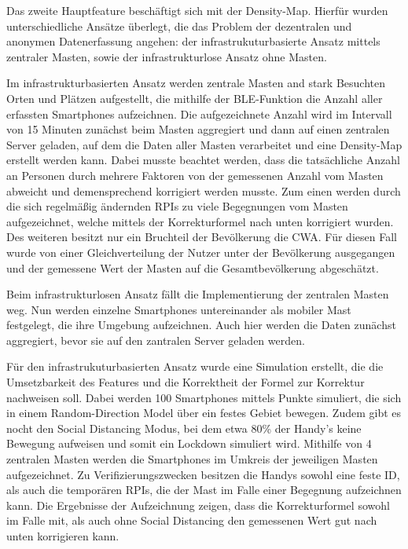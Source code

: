 \documentclass[conference,compsoc]{IEEEtran}
\begin{document}
Das zweite Hauptfeature beschäftigt sich mit der Density-Map. 
Hierfür wurden unterschiedliche Ansätze überlegt, die das Problem der dezentralen und anonymen Datenerfassung angehen: 
der infrastrukuturbasierte Ansatz mittels zentraler Masten, sowie der infrastrukturlose Ansatz ohne Masten. 

Im infrastrukturbasierten Ansatz werden zentrale Masten and stark Besuchten Orten und Plätzen aufgestellt, die mithilfe der BLE-Funktion die Anzahl aller erfassten Smartphones aufzeichnen.
Die aufgezeichnete Anzahl wird im Intervall von 15 Minuten zunächst beim Masten aggregiert und dann auf einen zentralen Server geladen, auf dem die Daten aller Masten verarbeitet und eine Density-Map erstellt werden kann.
Dabei musste beachtet werden, dass die tatsächliche Anzahl an Personen durch mehrere Faktoren von der gemessenen Anzahl vom Masten abweicht und demensprechend korrigiert werden musste.
Zum einen werden durch die sich regelmäßig ändernden RPIs zu viele Begegnungen vom Masten aufgezeichnet, welche mittels der Korrekturformel nach unten korrigiert wurden.
Des weiteren besitzt nur ein Bruchteil der Bevölkerung die CWA. Für diesen Fall wurde von einer Gleichverteilung der Nutzer unter der Bevölkerung ausgegangen und der gemessene Wert der Masten auf die Gesamtbevölkerung abgeschätzt.

Beim infrastrukturlosen Ansatz fällt die Implementierung der zentralen Masten weg. 
Nun werden einzelne Smartphones untereinander als mobiler Mast festgelegt, die ihre Umgebung aufzeichnen.
Auch hier werden die Daten zunächst aggregiert, bevor sie auf den zantralen Server geladen werden.

Für den infrastrukuturbasierten Ansatz wurde eine Simulation erstellt, die die Umsetzbarkeit des Features und die Korrektheit der Formel zur Korrektur nachweisen soll. 
Dabei werden 100 Smartphones mittels Punkte simuliert, die sich in einem Random-Direction Model über ein festes Gebiet bewegen. 
Zudem gibt es nocht den \glqq Social Distancing \grqq{} Modus, bei dem etwa 80\% der Handy's keine Bewegung aufweisen und somit ein Lockdown simuliert wird.
Mithilfe von 4 zentralen Masten werden die Smartphones im Umkreis der jeweiligen Masten aufgezeichnet. 
Zu Verifizierungszwecken besitzen die Handys sowohl eine feste ID, als auch die temporären RPIs, die der Mast im Falle einer Begegnung aufzeichnen kann. 
Die Ergebnisse der Aufzeichnung zeigen, dass die Korrekturformel sowohl im Falle mit, als auch ohne Social Distancing den gemessenen Wert gut nach unten korrigieren kann. 
\end{document}
